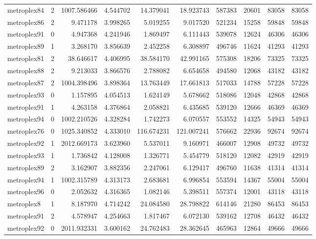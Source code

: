 \documentclass[../../../thesis.tex]{subfiles}
\begin{document}
\begin{longtable}{|l|r|r|r|r|r|r|r|r|r|}
metroplex84 & 2 & 1007.586466 & 4.544702 & 14.379041 & 18.923743 & 587383 & 20601 & 83058 & 83058 \\
metroplex86 & 2 & 9.471178 & 3.998265 & 5.019255 & 9.017520 & 521234 & 15258 & 59848 & 59848 \\
metroplex91 & 0 & 4.947368 & 4.241946 & 1.869497 & 6.111443 & 539078 & 12624 & 46306 & 46306 \\
metroplex89 & 1 & 3.268170 & 3.856639 & 2.452258 & 6.308897 & 496746 & 11624 & 41293 & 41293 \\
metroplex81 & 2 & 38.646617 & 4.406995 & 38.584170 & 42.991165 & 575308 & 18206 & 73325 & 73325 \\
metroplex88 & 2 & 9.213033 & 3.866576 & 2.788082 & 6.654658 & 494580 & 12068 & 43182 & 43182 \\
metroplex87 & 2 & 1004.398496 & 3.898364 & 13.763449 & 17.661813 & 517033 & 14788 & 57228 & 57228 \\
metroplex93 & 0 & 1.157895 & 4.054513 & 1.624149 & 5.678662 & 518086 & 12048 & 42868 & 42868 \\
metroplex91 & 1 & 4.263158 & 4.376864 & 2.058821 & 6.435685 & 539120 & 12666 & 46369 & 46369 \\
metroplex94 & 0 & 1002.210526 & 4.328284 & 1.742273 & 6.070557 & 553552 & 14325 & 54943 & 54943 \\
metroplex76 & 0 & 1025.340852 & 4.333010 & 116.674231 & 121.007241 & 576662 & 22936 & 92674 & 92674 \\
metroplex92 & 1 & 2012.669173 & 3.623960 & 5.537011 & 9.160971 & 466007 & 12908 & 49732 & 49732 \\
metroplex93 & 1 & 1.736842 & 4.128008 & 1.326771 & 5.454779 & 518120 & 12082 & 42919 & 42919 \\
metroplex89 & 2 & 3.162907 & 3.882356 & 2.247061 & 6.129417 & 496760 & 11638 & 41314 & 41314 \\
metroplex94 & 1 & 1002.315789 & 4.313173 & 2.683681 & 6.996854 & 553594 & 14367 & 55004 & 55004 \\
metroplex96 & 0 & 2.052632 & 4.316365 & 1.082146 & 5.398511 & 557374 & 12001 & 43118 & 43118 \\
metroplex8 & 1 & 8.187970 & 4.714242 & 24.084580 & 28.798822 & 614146 & 21280 & 86453 & 86453 \\
metroplex91 & 2 & 4.578947 & 4.254663 & 1.817467 & 6.072130 & 539162 & 12708 & 46432 & 46432 \\
metroplex92 & 0 & 2011.932331 & 3.600162 & 24.762483 & 28.362645 & 465963 & 12864 & 49666 & 49666 \\

\end{longtable}
\end{document}
